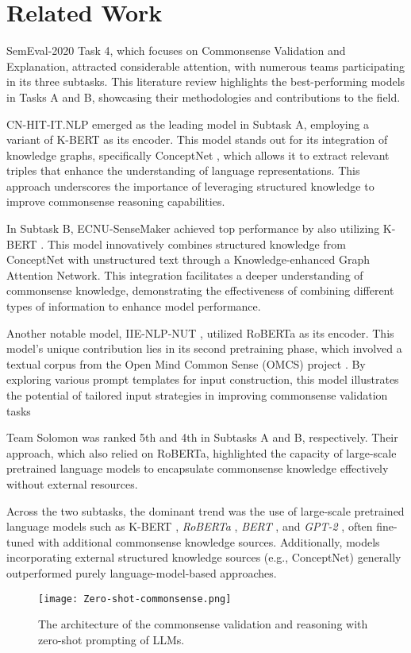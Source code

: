 \section{Related Work}
SemEval-2020 Task 4, which focuses on Commonsense Validation and Explanation, attracted considerable attention, with numerous teams participating in its three subtasks. This literature review highlights the best-performing models in Tasks A and B, showcasing their methodologies and contributions to the field.

CN-HIT-IT.NLP \cite{zhang2020cn} emerged as the leading model in Subtask A, employing a variant of K-BERT  \cite{liu2019kbert} as its encoder. This model stands out for its integration of knowledge graphs, specifically ConceptNet \cite{10.5555/3298023.3298212}, which allows it to extract relevant triples that enhance the understanding of language representations. This approach underscores the importance of leveraging structured knowledge to improve commonsense reasoning capabilities.

In Subtask B, ECNU-SenseMaker \cite{zhao2020ecnu} achieved top performance by also utilizing K-BERT \cite{liu2019kbert}. This model innovatively combines structured knowledge from ConceptNet \cite{10.5555/3298023.3298212} with unstructured text through a Knowledge-enhanced Graph Attention Network. This integration facilitates a deeper understanding of commonsense knowledge, demonstrating the effectiveness of combining different types of information to enhance model performance.

Another notable model, IIE-NLP-NUT \cite{xing-etal-2020-iie}, utilized RoBERTa as its encoder. This model's unique contribution lies in its second pretraining phase, which involved a textual corpus from the Open Mind Common Sense (OMCS) project \cite{10.1007/3-540-36124-3_77}. By exploring various prompt templates for input construction, this model illustrates the potential of tailored input strategies in improving commonsense validation tasks 


Team Solomon \cite{srivastava-etal-2020-team} was ranked 5th and 4th in Subtasks A and B, respectively. Their approach, which also relied on RoBERTa, highlighted the capacity of large-scale pretrained language models to encapsulate commonsense knowledge effectively without external resources. 

Across the two subtasks, the dominant trend was the use of large-scale pretrained language models such as  K-BERT  \cite{liu2019kbert}, \textit{RoBERTa} \cite{liu2019roberta}, \textit{BERT} \cite{devlin2018bert}, and \textit{GPT-2} \cite{radford2019gpt2}, often fine-tuned with additional commonsense knowledge sources. Additionally, models incorporating external structured knowledge sources (e.g., ConceptNet) generally outperformed purely language-model-based approaches.
\begin{figure*}[t]
    \centering
  \texttt{[image: Zero-shot-commonsense.png]} \hfill
  \caption {The  architecture of the commonsense validation and reasoning with zero-shot prompting of LLMs.}
  \label{model architecture}
\end{figure*}